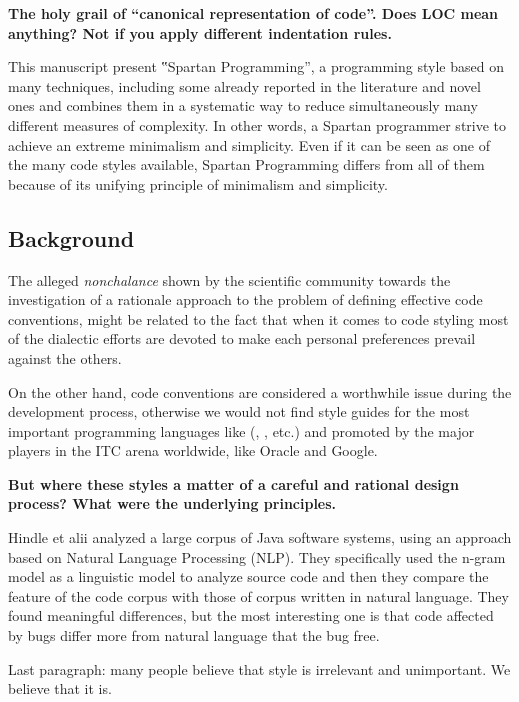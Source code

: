 \textbf{The holy grail of ``canonical representation of code''.  
  Does LOC mean anything?  Not if you apply different indentation 
rules.}

This manuscript present ‟Spartan Programming”, a programming style based on
many techniques, including some already reported in the literature and novel
ones and combines them in a systematic way to reduce simultaneously many
different measures of complexity. In other words, a Spartan programmer strive
to achieve an extreme minimalism and simplicity. Even if it can be seen as one
of the many code styles available, Spartan Programming differs from all of them
because of its unifying principle of minimalism and simplicity.

\subsection{Background}

The alleged \emph{nonchalance} shown by the scientific community towards the
investigation of a rationale approach to the problem of defining effective code
conventions, might be related to the fact that when it comes to code styling
most of the dialectic efforts are devoted to make each personal preferences 
prevail against the others.

On the other hand, code conventions are considered a worthwhile issue during
the development process, otherwise we would not find style guides for the most important
programming languages like (\Java, \CC, etc.) and promoted by the major players in
the ITC arena worldwide, like Oracle 
and Google.

\textbf{But where these styles a matter of a careful and rational design process?
What were the underlying principles.}

Hindle et alii \cite{Hindle:Bar:Su:Gabel:Devanbu:12} analyzed a large corpus of 
Java software systems, using an approach based on Natural Language Processing (NLP).
They specifically used the n-gram model as a linguistic model to analyze source code
and then they compare the feature of the code corpus with those of corpus
written in natural language. They found meaningful differences, but the most interesting
one is that code affected by bugs differ more from natural language that the bug free.

Last paragraph: many people believe that style is irrelevant and unimportant.
We believe that it is.

